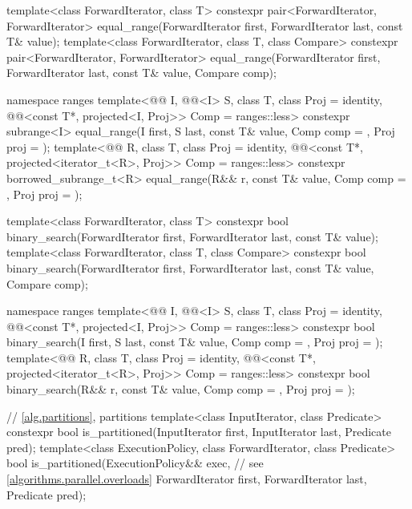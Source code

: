 \begin{codeblock}
{  template<class ForwardIterator, class T>
    constexpr pair<ForwardIterator, ForwardIterator>
      equal_range(ForwardIterator first, ForwardIterator last,
                  const T& value);
  template<class ForwardIterator, class T, class Compare>
    constexpr pair<ForwardIterator, ForwardIterator>
      equal_range(ForwardIterator first, ForwardIterator last,
                  const T& value, Compare comp);

  namespace ranges {
    template<@@ I, @@<I> S, class T, class Proj = identity,
             @@<const T*, projected<I, Proj>> Comp = ranges::less>
      constexpr subrange<I>
        equal_range(I first, S last, const T& value, Comp comp = {}, Proj proj = {});
    template<@@ R, class T, class Proj = identity,
             @@<const T*, projected<iterator_t<R>, Proj>> Comp =
               ranges::less>
      constexpr borrowed_subrange_t<R>
        equal_range(R&& r, const T& value, Comp comp = {}, Proj proj = {});
  }

  template<class ForwardIterator, class T>
    constexpr bool
      binary_search(ForwardIterator first, ForwardIterator last,
                    const T& value);
  template<class ForwardIterator, class T, class Compare>
    constexpr bool
      binary_search(ForwardIterator first, ForwardIterator last,
                    const T& value, Compare comp);

  namespace ranges {
    template<@@ I, @@<I> S, class T, class Proj = identity,
             @@<const T*, projected<I, Proj>> Comp = ranges::less>
      constexpr bool binary_search(I first, S last, const T& value, Comp comp = {},
                                   Proj proj = {});
    template<@@ R, class T, class Proj = identity,
             @@<const T*, projected<iterator_t<R>, Proj>> Comp =
               ranges::less>
      constexpr bool binary_search(R&& r, const T& value, Comp comp = {},
                                   Proj proj = {});
  }

  // \ref{alg.partitions}, partitions
  template<class InputIterator, class Predicate>
    constexpr bool is_partitioned(InputIterator first, InputIterator last, Predicate pred);
  template<class ExecutionPolicy, class ForwardIterator, class Predicate>
    bool is_partitioned(ExecutionPolicy&& exec,                 // see \ref{algorithms.parallel.overloads}
                        ForwardIterator first, ForwardIterator last, Predicate pred);

}
\end{codeblock}
